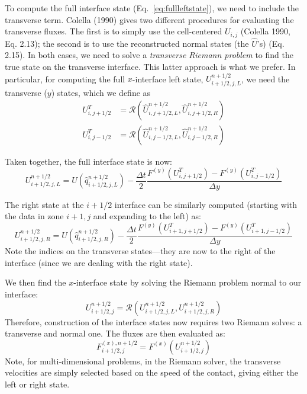 To compute the full interface state (Eq.~\ref{eq:fullleftstate}), we 
need to include the transverse term.
Colella (1990) gives two different procedures for evaluating the
transverse fluxes.  The first is to simply use the cell-centered
$U_{i,j}$ (Colella 1990,
Eq. 2.13); the second is to use the reconstructed normal states (the
$\hat{U}$'s) (Eq. 2.15).  In both cases, we need to solve a {\em
  transverse Riemann problem} to find the true state on the transverse
interface.  This latter approach is what we prefer.  In particular, 
for computing the full $x$-interface left state, $U_{i+1/2,j,L}^{n+1/2}$, we need the 
transverse ($y$) states, which we define as
\begin{align}
U^T_{i,j+1/2} &= \mathcal{R}(\hat{U}^{n+1/2}_{i,j+1/2,L}, 
                            \hat{U}^{n+1/2}_{i,j+1/2,R}) \\
U^T_{i,j-1/2} &= \mathcal{R}(\hat{U}^{n+1/2}_{i,j-1/2,L}, 
                            \hat{U}^{n+1/2}_{i,j-1/2,R})
\end{align}

Taken together, the full interface state is now:
\begin{equation}
U_{i+1/2,j,L}^{n+1/2} = U(\hat{q}_{i+1/2,j,L}^{n+1/2}) 
   - \frac{\Delta t}{2} \frac{F^{(y)}(U^T_{i,j+1/2}) - F^{(y)}(U^T_{i,j-1/2})}{\Delta y}
\end{equation}

The right state at the $i+1/2$ interface can be similarly computed (starting with the
data in zone $i+1,j$ and expanding to the left) as:
\begin{equation}
U_{i+1/2,j,R}^{n+1/2} = U(\hat{q}_{i+1/2,j,R}^{n+1/2}) 
   - \frac{\Delta t}{2} \frac{F^{(y)}(U^T_{i+1,j+1/2}) - F^{(y)}(U^T_{i+1,j-1/2})}{\Delta y}
\end{equation}
Note the indices on the transverse states---they are now to the right of the interface (since
we are dealing with the right state).

We then find the $x$-interface state by solving the Riemann problem
normal to our interface:
\begin{equation}
U_{i+1/2,j}^{n+1/2} = \mathcal{R}(U_{i+1/2,j,L}^{n+1/2}, U_{i+1/2,j,R}^{n+1/2})
\end{equation}
Therefore, construction of the interface states now requires two
Riemann solves: a transverse and normal one.  The fluxes are then evaluated as:
\begin{equation}
F^{(x),n+1/2}_{i+1/2,j} = F^{(x)}(U_{i+1/2,j}^{n+1/2})
\end{equation}
Note, for multi-dimensional problems, in the Riemann solver, the transverse
velocities are simply selected based on the speed of the contact, giving
either the left or right state.
 
